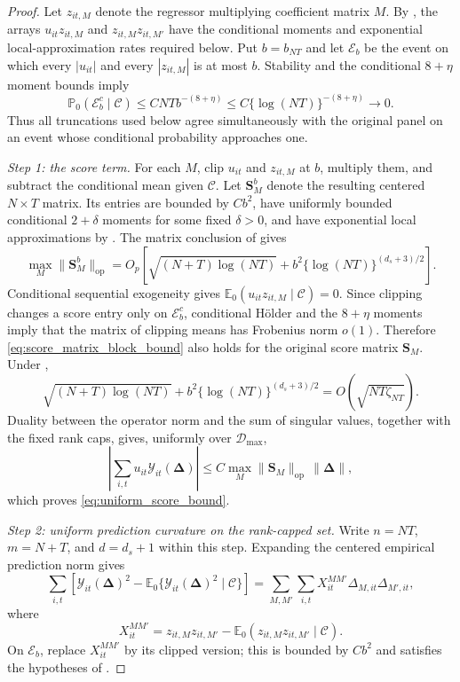 \documentclass[11pt]{article}
\numberwithin{equation}{section}
\theoremstyle{remark}
\newcommand{\Ezero}{\mathbb E_0}
\newcommand{\Pzero}{\mathbb P_0}
\newcommand{\op}{\operatorname{op}}
\newcommand{\bDelta}{\bm\Delta}
\newcommand{\calD}{\mathcal D}
\begin{document}
\begin{proof}
Let $z_{it,M}$ denote the regressor multiplying coefficient matrix $M$. By , the arrays $u_{it}z_{it,M}$ and $z_{it,M}z_{it,M'}$ have the conditional moments and exponential local-approximation rates required below. Put $b=b_{NT}$ and let $\mathcal E_b$ be the event on which every $|u_{it}|$ and every $|z_{it,M}|$ is at most $b$. Stability and the conditional $8+\eta$ moment bounds imply
\[
\Pzero(\mathcal E_b^c\mid\mathscr C)
\le
CNT b^{-(8+\eta)}
\le
C\{\log(NT)\}^{-(8+\eta)}
\longrightarrow0.
\]
Thus all truncations used below agree simultaneously with the original panel on an event whose conditional probability approaches one.

\emph{Step 1: the score term.}
For each $M$, clip $u_{it}$ and $z_{it,M}$ at $b$, multiply them, and subtract the conditional mean given $\mathscr C$. Let $\bm S_M^{b}$ denote the resulting centered $N\times T$ matrix. Its entries are bounded by $Cb^2$, have uniformly bounded conditional $2+\delta$ moments for some fixed $\delta>0$, and have exponential local approximations by . The matrix conclusion of  gives
\begin{equation}
\label{eq:score_matrix_block_bound}
\max_M\|\bm S_M^{b}\|_{\op}
=
O_p\!\left[
\sqrt{(N+T)\log(NT)}
+b^2\{\log(NT)\}^{(d_s+3)/2}
\right].
\end{equation}
Conditional sequential exogeneity gives $\Ezero(u_{it}z_{it,M}\mid\mathscr C)=0$. Since clipping changes a score entry only on $\mathcal E_b^c$, conditional H\"older and the $8+\eta$ moments imply that the matrix of clipping means has Frobenius norm $o(1)$. Therefore \eqref{eq:score_matrix_block_bound} also holds for the original score matrix $\bm S_M$. Under ,
\[
\sqrt{(N+T)\log(NT)}
+b^2\{\log(NT)\}^{(d_s+3)/2}
=
O\!\left(\sqrt{NT\zeta_{NT}}\right).
\]
Duality between the operator norm and the sum of singular values, together with the fixed rank caps, gives, uniformly over $\calD_{\max}$,
\[
\left|
\sum_{i,t}u_{it}\mathcal Y_{it}(\bDelta)
\right|
\le
C\max_M\|\bm S_M\|_{\op}\,\|\bDelta\|,
\]
which proves \eqref{eq:uniform_score_bound}.

\emph{Step 2: uniform prediction curvature on the rank-capped set.}
Write $n=NT$, $m=N+T$, and $d=d_s+1$ within this step. Expanding the centered empirical prediction norm gives
\begin{equation}
\label{eq:quadratic_pair_expansion}
\sum_{i,t}
\left[
\mathcal Y_{it}(\bDelta)^2
-
\Ezero\{\mathcal Y_{it}(\bDelta)^2\mid\mathscr C\}
\right]
=
\sum_{M,M'}\sum_{i,t}
X_{it}^{MM'}\Delta_{M,it}\Delta_{M',it},
\end{equation}
where
\[
X_{it}^{MM'}
=
z_{it,M}z_{it,M'}
-
\Ezero(z_{it,M}z_{it,M'}\mid\mathscr C).
\]
On $\mathcal E_b$, replace $X_{it}^{MM'}$ by its clipped version; this is bounded by $Cb^2$ and satisfies the hypotheses of .


\end{proof}
\end{document}
